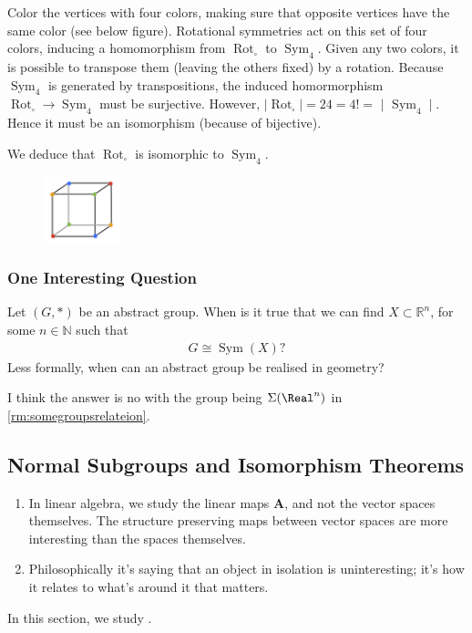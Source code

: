 \documentclass{article}
\newcommand{\Sym}{\operatorname{Sym}}
\begin{document}
Color the vertices with four colors, making sure that opposite vertices have the same color (see below figure). Rotational symmetries act on this set of four colors, inducing a homomorphism from $\operatorname{Rot}_{\square}$ to $\Sym_{4} .$ Given any two colors, it is possible to transpose them (leaving the others fixed) by a rotation. Because $\Sym_{4}$ is generated by transpositions, the induced homormorphism $\operatorname{Rot}_{\square}\rightarrow \Sym_{4}$ must be surjective. However, $\left|\operatorname{Rot}_{\square}\right|=24=4 !=$ $\mid$ $\Sym_{4} \mid .$ Hence it must be an isomorphism (because of bijective). 
\begin{lema}
We deduce that $\operatorname{Rot}_{\square}$ is isomorphic to $\Sym_{4}$.
\end{lema}
\begin{figure}[h]
\centering
\includegraphics[width=0.2\textwidth]{Figs/cube2.png}
\end{figure}


\subsubsection{One Interesting Question}
Let $(G, *)$ be an abstract group. When is it true that we can find $X \subset \mathbb{R}^{n}$, for some $n \in \mathbb{N}$ such that
\begin{align*}
G \cong \operatorname{Sym}(X) ?
\end{align*}
Less formally, when can an abstract group be realised in geometry? 
\begin{rema}
I think the answer is no with the group being $\Sigma(\Real^n)$ in \cref{rm:somegroupsrelateion}.
\end{rema}

\subsection{Normal Subgroups and Isomorphism Theorems}
\begin{enumerate}
    \item In linear algebra, we study the linear maps $\boldsymbol{A}$, and not the vector spaces themselves. The structure preserving maps between vector spaces are more interesting than the spaces themselves.
    \item Philosophically it's saying that an object in isolation is uninteresting; it's how it relates to what's around it that matters.
\end{enumerate} 
In this section, we study .
\end{document}
